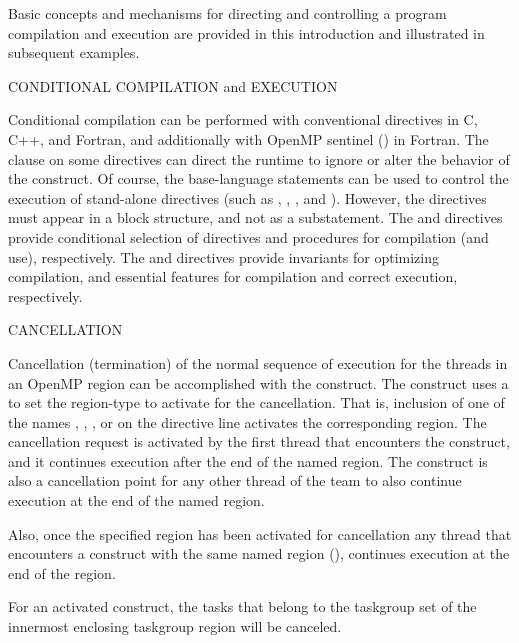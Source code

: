 \label{chap:program_control}

Basic concepts and mechanisms for directing and controlling a program compilation and execution
are provided in this introduction and illustrated in subsequent examples.

\bigskip
CONDITIONAL COMPILATION and EXECUTION

Conditional compilation can be performed with conventional  directives
in C, C++, and Fortran, and additionally with OpenMP sentinel (\scode{!$}) in Fortran. 
The  clause on some directives
can direct the runtime to ignore or alter the behavior of the construct.
Of course, the base-language  statements can be used to control the execution
of stand-alone directives (such as , , , 
and ).
However, the directives must appear in a block structure, and not as a substatement.
The  and  directives provide conditional 
selection of directives and procedures for compilation (and use), respectively.
The  and  directives provide invariants
for optimizing compilation, and essential features for compilation 
and correct execution, respectively.


\bigskip
CANCELLATION

Cancellation (termination) of the normal sequence of execution for the threads in an OpenMP region can
be accomplished with the  construct. The construct uses a
 to set the region-type to activate for the cancellation. 
That is, inclusion of one of the  names , , 
,  or  on the directive line 
activates the corresponding region.
The cancellation request is activated by the first thread that encounters
the  construct, and it
continues execution after the end of the named region.
The  construct is also a cancellation point for any other thread of the team 
to also continue execution at the end of the named region.  

Also, once the specified region has been activated for cancellation any thread that encounters
a  construct with the same named region (),
continues execution at the end of the region.

For an activated  construct, the tasks that
belong to the taskgroup set of the innermost enclosing taskgroup region will be canceled. 

